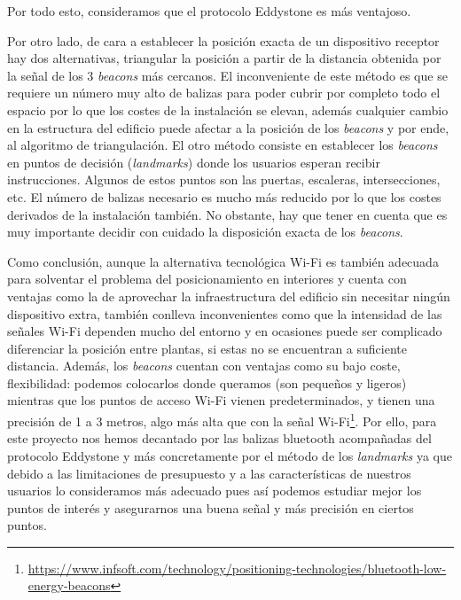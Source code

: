 Por todo esto, consideramos que el protocolo Eddystone es más ventajoso. 

Por otro lado, de cara a establecer la posición exacta de un dispositivo receptor hay dos alternativas, triangular la posición a partir de la distancia obtenida por la señal de los 3 \textit{beacons} más cercanos. El inconveniente de este método es que se requiere un número muy alto de balizas para poder cubrir por completo todo el espacio por lo que los costes de la instalación se elevan, además cualquier cambio en la estructura del edificio puede afectar a la posición de los \textit{beacons} y por ende, al algoritmo de triangulación. El otro método consiste en establecer los \textit{beacons} en puntos de decisión (\textit{landmarks}) donde los usuarios esperan recibir instrucciones. Algunos de estos puntos son las puertas, escaleras, intersecciones, etc. El número de balizas necesario es mucho más reducido por lo que los costes derivados de la instalación también. No obstante, hay que tener en cuenta que es muy importante decidir con cuidado la disposición exacta de los \textit{beacons}. 

Como conclusión, aunque la alternativa tecnológica Wi-Fi es también adecuada para solventar el problema del posicionamiento en interiores y cuenta con ventajas como la de aprovechar la infraestructura del edificio sin necesitar ningún dispositivo extra, también conlleva inconvenientes como que la intensidad de las señales Wi-Fi dependen mucho del entorno y en ocasiones puede ser complicado diferenciar la posición entre plantas, si estas no se encuentran a suficiente distancia. Además, los \textit{beacons} cuentan con ventajas como su bajo coste, flexibilidad: podemos colocarlos donde queramos (son pequeños y ligeros) mientras que los puntos de acceso Wi-Fi vienen predeterminados, y tienen una precisión de 1 a 3 metros, algo más alta que con la señal Wi-Fi\footnote{\url{https://www.infsoft.com/technology/positioning-technologies/bluetooth-low-energy-beacons}}. Por ello, para este proyecto nos hemos decantado por las balizas bluetooth acompañadas del protocolo Eddystone y más concretamente por el método de los \textit{landmarks} ya que debido a las limitaciones de presupuesto y a las características de nuestros usuarios lo consideramos más adecuado pues así podemos estudiar mejor los puntos de interés y asegurarnos una buena señal y más precisión en ciertos puntos.






 